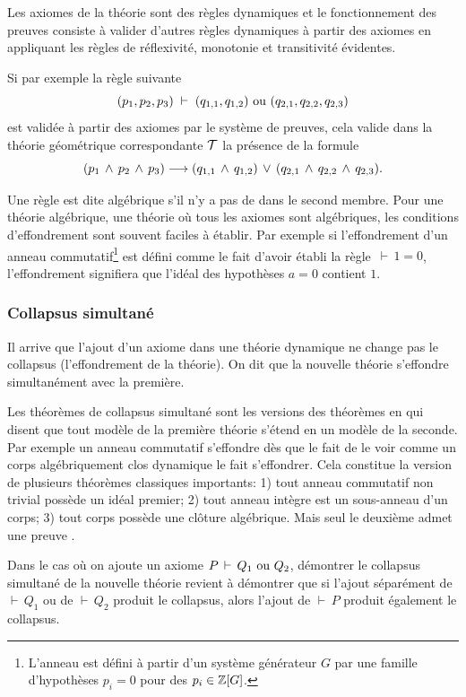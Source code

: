 Les axiomes de la théorie sont  des règles dynamiques et le fonctionnement des
preuves consiste à valider d'autres règles dynamiques à partir des axiomes en appliquant les règles de réflexivité, monotonie et transitivité évidentes. 

Si par exemple la règle suivante 
$$
(p_1,p_2,p_3)\; \vdash\; (q_{1,1},q_{1,2}) \hbox{ ou } (q_{2,1},q_{2,2},q_{2,3})
$$
est validée à partir des axiomes par le système de preuves, cela valide 
dans la théorie géométrique correspondante ${\cal T}$ la présence de la formule  
$$
(p_1 \,\wedge\, p_2 \,\wedge\, p_3) \longrightarrow (q_{1,1} \,\wedge\, q_{1,2}) \,\vee\, (q_{2,1} \,\wedge\, q_{2,2} \,\wedge\, q_{2,3}).
$$

Une règle est dite algébrique s'il n'y a pas de  dans le second membre.
Pour une théorie algébrique, \cad une théorie où tous les axiomes sont algébriques, les conditions d'effondrement sont souvent faciles à établir.
Par exemple si l'effondrement d'un anneau commutatif\footnote{L'anneau est défini à partir d'un système générateur $G$ par une famille d'hypothèses $p_i=0$ pour des $p_i\in\mathbb{Z}[G]$.} est défini comme le fait d'avoir établi la règle $\,\vdash\,1=0$, l'effondrement signifiera que l'idéal des hypothèses $a=0$ contient $1$. 

\subsubsection*{Collapsus simultané}
Il arrive que l'ajout d'un axiome dans une théorie dynamique ne change pas
le collapsus (l'effondrement de la théorie). On dit que la nouvelle théorie
s'effondre simultanément avec la première.


Les théorèmes de collapsus simultané sont les versions \covs des théorèmes en \clama qui disent que tout modèle de la première théorie s'étend en un modèle de la seconde. Par exemple un anneau commutatif s'effondre dès que le fait de le voir comme un corps algébriquement clos dynamique le fait s'effondrer.
Cela constitue la version \cov de plusieurs théorèmes classiques importants: 1) tout anneau commutatif non trivial possède un idéal premier; 2) tout anneau intègre est un sous-anneau d'un corps; 3) tout corps possède une clôture algébrique. Mais seul le deuxième admet une preuve \cov.

Dans le cas où on ajoute un axiome $P\,\vdash\,Q_1 \hbox{ ou } Q_2$, démontrer le collapsus simultané de la nouvelle théorie revient à démontrer que
si l'ajout séparément de $\vdash\,Q_1$ ou de $\vdash\,Q_2$ produit le collapsus, alors l'ajout de $\vdash\, P$ produit également le collapsus.

